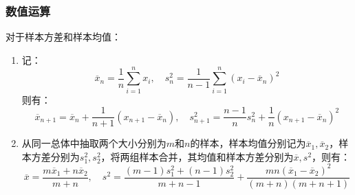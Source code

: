 \subsubsection{数值运算}
\begin{theorem}
	对于样本方差和样本均值：
	\begin{enumerate}
		\item 记：
		\begin{equation*}
			\overline{x}_n=\frac{1}{n}\sum_{i=1}^{n}x_i,\quad s_n^2=\frac{1}{n-1}\sum_{i=1}^{n}(x_i-\overline{x}_n)^2
		\end{equation*}
		则有：
		\begin{equation*}
			\overline{x}_{n+1}=\overline{x}_n+\frac{1}{n+1}(x_{n+1}-\overline{x}_n),\quad s_{n+1}^2=\frac{n-1}{n}s_n^2+\frac{1}{n}(x_{n+1}-\overline{x}_n)^2
		\end{equation*}
		\item 从同一总体中抽取两个大小分别为$m$和$n$的样本，样本均值分别记为$\overline{x}_1,\overline{x}_2$，样本方差分别为$s_1^2,s_2^2$，将两组样本合并，其均值和样本方差分别为$\overline{x},s^2$，则有：
		\begin{equation*}
			\overline{x}=\frac{m\overline{x}_1+n\overline{x}_2}{m+n},\quad s^2=\frac{(m-1)s_1^2+(n-1)s_2^2}{m+n-1}+\frac{mn(\overline{x}_1-\overline{x}_2)^2}{(m+n)(m+n+1)}
		\end{equation*}
	\end{enumerate}
\end{theorem}
